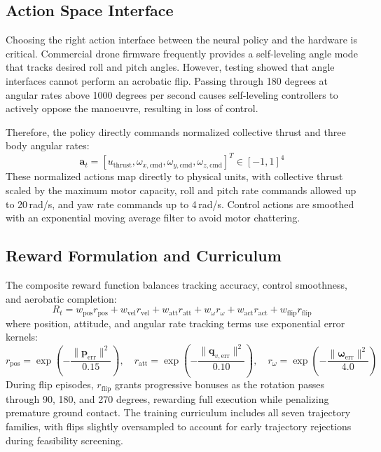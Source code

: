 \documentclass[11pt,a4paper]{article}
\begin{document}
\subsection{Action Space Interface}
Choosing the right action interface between the neural policy and the hardware is critical. Commercial drone firmware frequently provides a self-leveling angle mode that tracks desired roll and pitch angles. However, testing showed that angle interfaces cannot perform an acrobatic flip. Passing through 180 degrees at angular rates above 1000 degrees per second causes self-leveling controllers to actively oppose the manoeuvre, resulting in loss of control.

Therefore, the policy directly commands normalized collective thrust and three body angular rates:
\begin{equation}
  \mathbf{a}_t = [u_{\text{thrust}}, \omega_{x,\text{cmd}}, \omega_{y,\text{cmd}}, \omega_{z,\text{cmd}}]^T \in [-1, 1]^4
\end{equation}
These normalized actions map directly to physical units, with collective thrust scaled by the maximum motor capacity, roll and pitch rate commands allowed up to 20\,rad/s, and yaw rate commands up to 4\,rad/s. Control actions are smoothed with an exponential moving average filter to avoid motor chattering.

\subsection{Reward Formulation and Curriculum}
The composite reward function balances tracking accuracy, control smoothness, and aerobatic completion:
\begin{equation}
  R_t = w_{\text{pos}} r_{\text{pos}} + w_{\text{vel}} r_{\text{vel}} + w_{\text{att}} r_{\text{att}} + w_\omega r_\omega + w_{\text{act}} r_{\text{act}} + w_{\text{flip}} r_{\text{flip}}
\end{equation}
where position, attitude, and angular rate tracking terms use exponential error kernels:
\begin{equation}
  r_{\text{pos}} = \exp\left(-\frac{\|\mathbf{p}_{\text{err}}\|^2}{0.15}\right), \quad
  r_{\text{att}} = \exp\left(-\frac{\|\mathbf{q}_{v,\text{err}}\|^2}{0.10}\right), \quad
  r_\omega = \exp\left(-\frac{\|\boldsymbol{\omega}_{\text{err}}\|^2}{4.0}\right)
\end{equation}
During flip episodes, $r_{\text{flip}}$ grants progressive bonuses as the rotation passes through 90, 180, and 270 degrees, rewarding full execution while penalizing premature ground contact. The training curriculum includes all seven trajectory families, with flips slightly oversampled to account for early trajectory rejections during feasibility screening.
\end{document}
